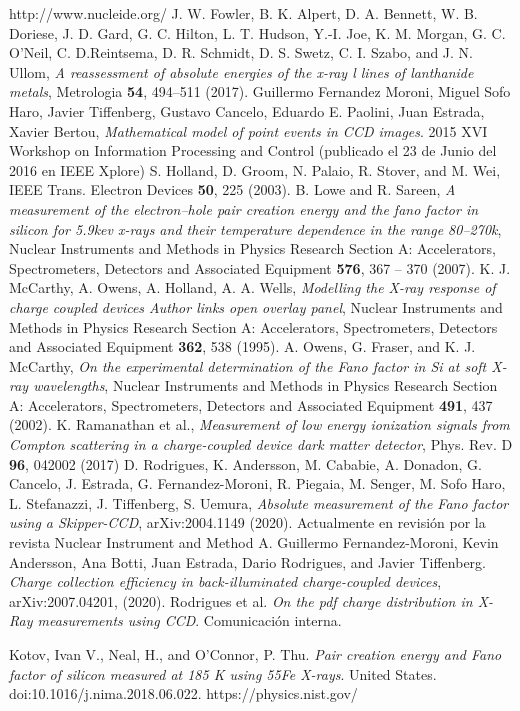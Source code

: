 \documentclass[a4paper,12pt]{report} %
\begin{document}
\begin{thebibliography}{99}
http://www.nucleide.org/
J. W. Fowler, B. K. Alpert, D. A. Bennett, W. B. Doriese, J. D. Gard,
G. C. Hilton, L. T. Hudson, Y.-I. Joe, K. M. Morgan, G. C. O’Neil, C. D.Reintsema, D. R. Schmidt, D. S. Swetz, C. I. Szabo, and J. N. Ullom, \textit{A reassessment of absolute energies of the x-ray l lines of lanthanide metals}, Metrologia \textbf{54}, 494–511 (2017).
Guillermo Fernandez Moroni, Miguel Sofo Haro, Javier Tiffenberg, Gustavo Cancelo, Eduardo E. Paolini, Juan Estrada, Xavier Bertou, \textit{Mathematical model of point events in CCD images}. 2015 XVI Workshop on Information Processing and Control (publicado el 23 de Junio del 2016 en IEEE Xplore)
S. Holland, D. Groom, N. Palaio, R. Stover, and M. Wei, IEEE Trans. Electron Devices \textbf{50}, 225 (2003).
B. Lowe and R. Sareen, \textit{A measurement of the electron–hole pair creation energy and the fano factor in silicon for 5.9kev x-rays and their temperature dependence in the range 80–270k}, Nuclear Instruments and Methods in Physics Research Section A: Accelerators, Spectrometers, Detectors and Associated Equipment \textbf{576}, 367 – 370 (2007).
K. J. McCarthy, A. Owens, A. Holland,  A. A. Wells, \textit{Modelling the X-ray response of charge coupled devices
Author links open overlay panel}, Nuclear Instruments and Methods in Physics Research Section A: Accelerators, Spectrometers, Detectors and Associated Equipment \textbf{362}, 538 (1995).
A. Owens, G. Fraser, and K. J. McCarthy, \textit{On the experimental determination of the Fano factor in Si at soft X-ray wavelengths}, Nuclear Instruments and Methods in Physics Research Section A: Accelerators, Spectrometers, Detectors and Associated Equipment \textbf{491}, 437 (2002).
K. Ramanathan et al., \textit{Measurement of low energy ionization signals from Compton scattering in a charge-coupled device dark matter detector}, Phys. Rev. D \textbf{96}, 042002 (2017)
D. Rodrigues, K. Andersson, M. Cababie, A. Donadon, G. Cancelo, J. Estrada, G. Fernandez-Moroni, R. Piegaia, M. Senger, M. Sofo Haro, L. Stefanazzi, J. Tiffenberg, S. Uemura, \textit{Absolute measurement of the Fano factor using a Skipper-CCD}, arXiv:2004.1149 (2020). Actualmente en revisión por la revista Nuclear Instrument and Method A.
Guillermo Fernandez-Moroni, Kevin Andersson, Ana Botti, Juan Estrada, Dario Rodrigues, and Javier Tiffenberg. \textit{Charge collection efficiency in back-illuminated charge-coupled devices}, arXiv:2007.04201, (2020).
Rodrigues et al. \textit{On the pdf charge distribution in X-Ray measurements using CCD}. Comunicación interna.

Kotov, Ivan V., Neal, H., and O'Connor, P. Thu. \textit{Pair creation energy and Fano factor of silicon measured at 185 K using 55Fe X-rays}. United States. doi:10.1016/j.nima.2018.06.022. %
https://physics.nist.gov/



\end{thebibliography}
\end{document}
